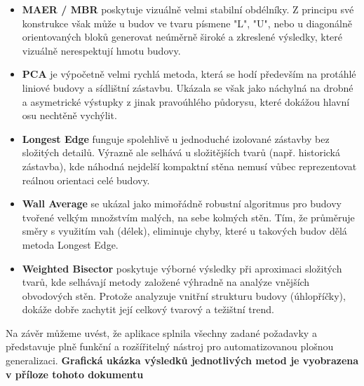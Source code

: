 \begin{itemize}
    \item \textbf{MAER / MBR} poskytuje vizuálně velmi stabilní obdélníky. Z principu své konstrukce však může u budov ve tvaru písmene "L", "U", nebo u diagonálně orientovaných bloků generovat neúměrně široké a zkreslené výsledky, které vizuálně nerespektují hmotu budovy.
    \item \textbf{PCA} je výpočetně velmi rychlá metoda, která se hodí především na protáhlé liniové budovy a sídlištní zástavbu. Ukázala se však jako náchylná na drobné a asymetrické výstupky z jinak pravoúhlého půdorysu, které dokážou hlavní osu nechtěně vychýlit.
    \item \textbf{Longest Edge} funguje spolehlivě u jednoduché izolované zástavby bez složitých detailů. Výrazně ale selhává u složitějších tvarů (např. historická zástavba), kde náhodná nejdelší kompaktní stěna nemusí vůbec reprezentovat reálnou orientaci celé budovy.
    \item \textbf{Wall Average} se ukázal jako mimořádně robustní algoritmus pro  budovy tvořené velkým množstvím malých, na sebe kolmých stěn. Tím, že průměruje směry s využitím vah (délek), eliminuje chyby, které u takových budov dělá metoda Longest Edge.
    \item \textbf{Weighted Bisector} poskytuje výborné výsledky při aproximaci složitých tvarů, kde selhávají metody založené výhradně na analýze vnějších obvodových stěn. Protože analyzuje vnitřní strukturu budovy (úhlopříčky), dokáže dobře zachytit její celkový tvarový a težištní trend.
\end{itemize}

Na závěr můžeme uvést, že aplikace splnila všechny zadané požadavky a představuje plně funkční a rozšířitelný nástroj pro automatizovanou plošnou generalizaci. \textbf {Grafická ukázka výsledků jednotlivých metod je vyobrazena v příloze tohoto dokumentu}










